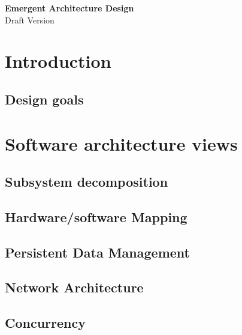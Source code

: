 \documentclass{article}
\begin{document}
\begin{minipage}[H]{\textwidth}
\vspace{0.3cm}
		\begin{center}
		  \vspace{0.3cm}
		  \Huge{\textbf{Emergent Architecture Design}}\\
		  \huge{Draft Version}
	      \vspace{0.3cm}	
   		  \vspace{0.7cm}	
		\end{center}
	\end{minipage}
\tableofcontents
\newpage
	\section{Introduction}
	
	 \subsection{Design goals}
	 
	 \section{Software architecture views}
	 \subsection{Subsystem decomposition} 
	 
	 \subsection{Hardware/software Mapping} 
	 
	\subsection{Persistent Data Management}
	

	\subsection{Network Architecture}
	
	 \subsection{Concurrency} 
	 
\end{document}
